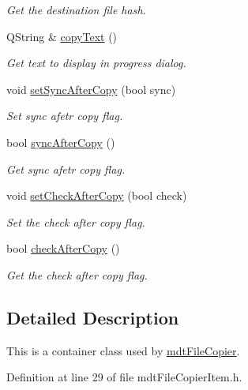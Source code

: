\begin{DoxyCompactItemize}
\begin{DoxyCompactList}\small\item\em Get the destination file hash. \end{DoxyCompactList}\item 
Q\-String \& \hyperlink{classmdt_file_copier_item_aee819f575bd9f0d060f12da3194ce2ae}{copy\-Text} ()
\begin{DoxyCompactList}\small\item\em Get text to display in progress dialog. \end{DoxyCompactList}\item 
void \hyperlink{classmdt_file_copier_item_a141b6cc40264a590781497c83d84bc65}{set\-Sync\-After\-Copy} (bool sync)
\begin{DoxyCompactList}\small\item\em Set sync afetr copy flag. \end{DoxyCompactList}\item 
bool \hyperlink{classmdt_file_copier_item_a82827e5a959e9fb9b437552fe80fa7a6}{sync\-After\-Copy} ()
\begin{DoxyCompactList}\small\item\em Get sync afetr copy flag. \end{DoxyCompactList}\item 
void \hyperlink{classmdt_file_copier_item_a196f41dd9ac0d71dd33b5bcf6d9737fa}{set\-Check\-After\-Copy} (bool check)
\begin{DoxyCompactList}\small\item\em Set the check after copy flag. \end{DoxyCompactList}\item 
bool \hyperlink{classmdt_file_copier_item_af18508003d547b6d35e26964311ae0ed}{check\-After\-Copy} ()
\begin{DoxyCompactList}\small\item\em Get the check after copy flag. \end{DoxyCompactList}\end{DoxyCompactItemize}


\subsection{Detailed Description}
This is a container class used by \hyperlink{classmdt_file_copier}{mdt\-File\-Copier}. 

Definition at line 29 of file mdt\-File\-Copier\-Item.\-h.



